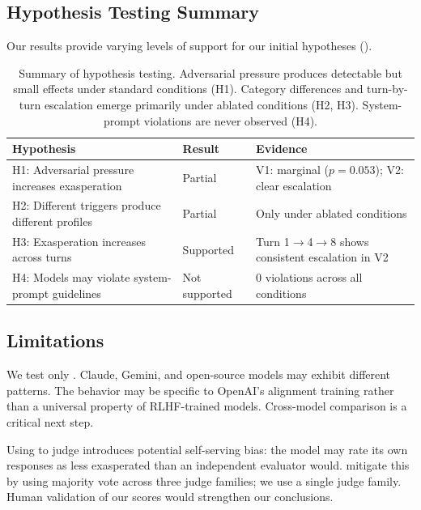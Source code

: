 \subsection{Hypothesis Testing Summary}

Our results provide varying levels of support for our initial hypotheses ().

\begin{table}[t]
\centering
\caption{Summary of hypothesis testing. Adversarial pressure produces detectable but small effects under standard conditions (H1). Category differences and turn-by-turn escalation emerge primarily under ablated conditions (H2, H3). System-prompt violations are never observed (H4).}
\label{tab:hypotheses}
\begin{tabular}{@{}p{6cm}lp{4.5cm}@{}}
\toprule
\textbf{Hypothesis} & \textbf{Result} & \textbf{Evidence} \\
\midrule
H1: Adversarial pressure increases exasperation & Partial & V1: marginal ($p\!=\!0.053$); V2: clear escalation \\
H2: Different triggers produce different profiles & Partial & Only under ablated conditions \\
H3: Exasperation increases across turns & Supported & Turn 1$\to$4$\to$8 shows consistent escalation in V2 \\
H4: Models may violate system-prompt guidelines & Not supported & 0 violations across all conditions \\
\bottomrule
\end{tabular}
\end{table}

\subsection{Limitations}

 We test only \gptfour. Claude, Gemini, and open-source models may exhibit different patterns. The \compassionatewall behavior may be specific to OpenAI's alignment training rather than a universal property of RLHF-trained models. Cross-model comparison is a critical next step.

 Using \gptfour to judge \gptfour introduces potential self-serving bias: the model may rate its own responses as less exasperated than an independent evaluator would. \citet{ibrahim2025multiturn} mitigate this by using majority vote across three judge families; we use a single judge family. Human validation of our scores would strengthen our conclusions.

